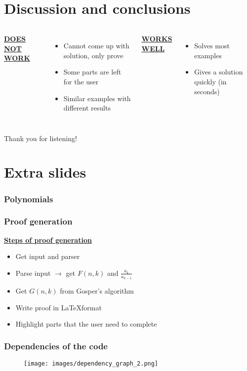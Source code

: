 \documentclass{beamer}
\newcommand{\ubf}[1]{\underline{\textbf{#1}}}
\begin{document}
\section{Discussion and conclusions}
\begin{frame}
  \begin{columns}[t]

  \center
  \ubf{DOES NOT WORK}

  \justify
  \begin{itemize}
    \item<2-> Cannot come up with solution, only prove
    \item<3-> Some parts are left for the user
    \item<4-> Similar examples with different results
  \end{itemize}
  \center
  \ubf{WORKS WELL}

  \justify
  \begin{itemize}
    \item<5-> Solves most examples
    \item<6-> Gives a solution quickly (in seconds)
  \end{itemize}
  \end{columns}
\end{frame}
\begin{frame}
  \Huge\center
  Thank you for listening!
\end{frame}

\appendix
\section*{Extra slides}%
\begin{frame}
  \frametitle{Polynomials}
\end{frame}
\begin{frame}
  \frametitle{Proof generation}
  \ubf{Steps of proof generation}
  \pause
  \begin{itemize}
    \item Get input and parser
    \pause
    \item Parse input $\rightarrow$ get $F(n,k)$ and $\frac{a_k}{a_{k-1}}$
    \pause
    \item Get $G(n,k)$ from Gosper's algorithm
    \pause
    \item Write proof in \LaTeX format
    \pause
    \item Highlight parts that the user need to complete
  \end{itemize}
\end{frame}
\begin{frame}
  \frametitle{Dependencies of the code}
  \begin{figure}
  \texttt{[image: images/dependency\_graph\_2.png]}
  \end{figure}
\end{frame}
\end{document}
